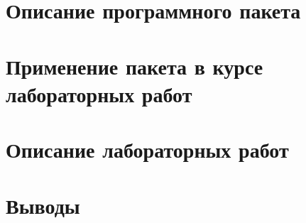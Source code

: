 \section{Описание программного пакета}


\section{Применение пакета в курсе лабораторных работ}


\section{Описание лабораторных работ}


\section{Выводы}

